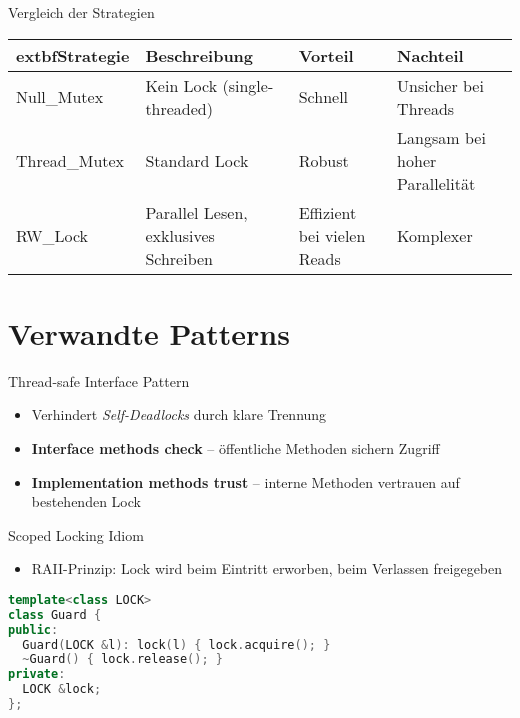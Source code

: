 \documentclass[aspectratio=169,10pt]{beamer}
\begin{document}
\begin{frame}{Vergleich der Strategien}
  \begin{tabular}{|l|l|l|l|}
  \hline
  	extbf{Strategie} & \textbf{Beschreibung} & \textbf{Vorteil} & \textbf{Nachteil} \\
  \hline
  Null\_Mutex & Kein Lock (single-threaded) & Schnell & Unsicher bei Threads \\
  Thread\_Mutex & Standard Lock & Robust & Langsam bei hoher Parallelität \\
  RW\_Lock & Parallel Lesen, exklusives Schreiben & Effizient bei vielen Reads & Komplexer \\
  \hline
  \end{tabular}
\end{frame}

\section{Verwandte Patterns}
\begin{frame}{Thread-safe Interface Pattern}
  \begin{itemize}
    \item Verhindert \textit{Self-Deadlocks} durch klare Trennung
    \item \textbf{Interface methods check} – öffentliche Methoden sichern Zugriff
    \item \textbf{Implementation methods trust} – interne Methoden vertrauen auf bestehenden Lock
  \end{itemize}
\end{frame}

\begin{frame}{Scoped Locking Idiom}
  \begin{itemize}
    \item RAII-Prinzip: Lock wird beim Eintritt erworben, beim Verlassen freigegeben
  \end{itemize}
  \vspace{1em}
  \begin{lstlisting}[language=C++]
template<class LOCK>
class Guard {
public:
  Guard(LOCK &l): lock(l) { lock.acquire(); }
  ~Guard() { lock.release(); }
private:
  LOCK &lock;
};
  \end{lstlisting}
\end{frame}

\end{document}
